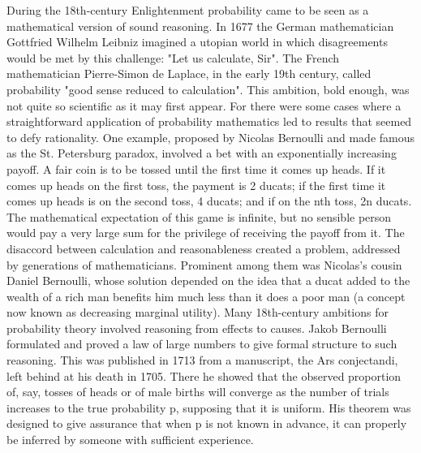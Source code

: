 During the 18th-century Enlightenment probability came to be seen as a mathematical version of sound reasoning. In 1677 the German mathematician Gottfried Wilhelm Leibniz imagined a utopian world in which disagreements would be met by this challenge: "Let us calculate, Sir". The French mathematician Pierre-Simon de Laplace, in the early 19th century, called probability "good sense reduced to calculation". This ambition, bold enough, was not quite so scientific as it may first appear. For there were some cases where a straightforward application of probability mathematics led to results that seemed to defy rationality. One example, proposed by Nicolas Bernoulli and made famous as the St. Petersburg paradox, involved a bet with an exponentially increasing payoff. A fair coin is to be tossed until the first time it comes up heads. If it comes up heads on the first toss, the payment is 2 ducats; if the first time it comes up heads is on the second toss, 4 ducats; and if on the nth toss, 2n ducats. The mathematical expectation of this game is infinite, but no sensible person would pay a very large sum for the privilege of receiving the payoff from it. The disaccord between calculation and reasonableness created a problem, addressed by generations of mathematicians. Prominent among them was Nicolas's cousin Daniel Bernoulli, whose solution depended on the idea that a ducat added to the wealth of a rich man benefits him much less than it does a poor man (a concept now known as decreasing marginal utility).\newline
Many 18th-century ambitions for probability theory involved reasoning from effects to causes. Jakob Bernoulli formulated and proved a law of large numbers to give formal structure to such reasoning. This was published in 1713 from a manuscript, the Ars conjectandi, left behind at his death in 1705. There he showed that the observed proportion of, say, tosses of heads or of male births will converge as the number of trials increases to the true probability p, supposing that it is uniform. His theorem was designed to give assurance that when p is not known in advance, it can properly be inferred by someone with sufficient experience.\newline
